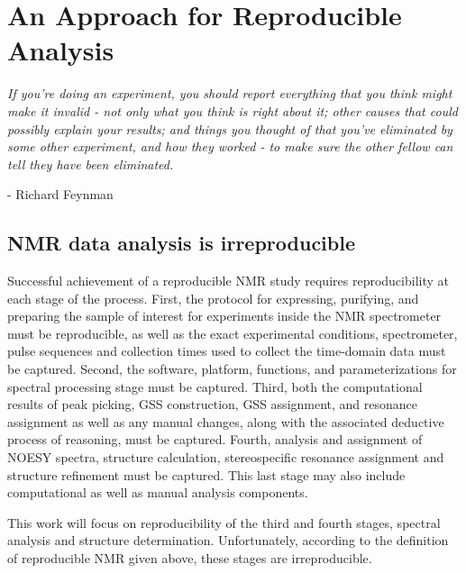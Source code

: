 \chapter{An Approach for Reproducible Analysis}

\begin{center}
  \textit{If you're doing an experiment, you should report everything that 
    you think might make it invalid - not only what you think is right about it; 
    other causes that could possibly explain your results; and things you 
    thought of that you've eliminated by some other experiment, and how they 
    worked - to make sure the other fellow can tell they have been eliminated.}

 - Richard Feynman
\end{center}



\section{NMR data analysis is irreproducible}
Successful achievement of a reproducible NMR study requires reproducibility at 
each stage of the process.  First, the protocol for expressing, purifying, and 
preparing the sample of interest for experiments inside the NMR spectrometer 
must be reproducible, as well as the exact experimental conditions, 
spectrometer, pulse sequences and collection times used to collect the 
time-domain data must be captured.  Second, the software, platform, functions, 
and parameterizations for spectral processing stage must be captured.  
Third, both the computational results of peak picking, GSS construction,
GSS assignment, and resonance assignment as well as any manual changes, 
along with the associated deductive process of reasoning, must be captured.  
Fourth, analysis and assignment of NOESY spectra, structure calculation, 
stereospecific resonance assignment and structure refinement must be captured.  
This last stage may also include computational as well as manual analysis 
components.  

This work will focus on reproducibility of the third and fourth stages, 
spectral analysis and structure determination.  Unfortunately, according to 
the definition of reproducible NMR given above, these stages are irreproducible.

